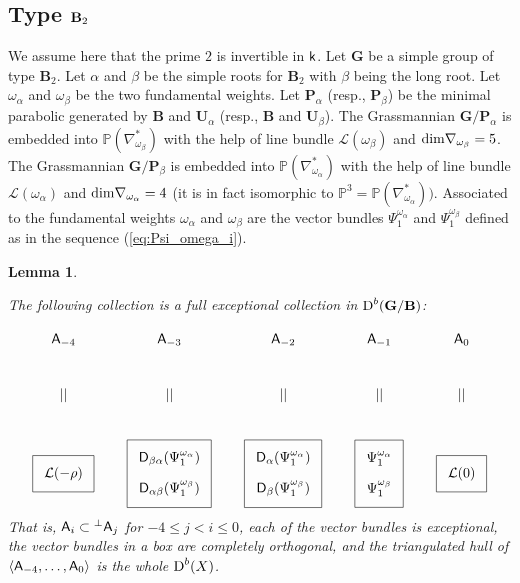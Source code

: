 \documentclass[sn-mathphys-num]{sn-jnl}%
\newcommand{\Ll}{\mathcal L}
\newcommand*{\Dd}{\mathop{\mathrm D\kern0pt}\nolimits}
\newcommand{\A}{{\sf A}}
\newcommand{\sk}{{\sf k}}
\newcommand{\Pp}{\mathbb P}
\newcommand{\bg}{\mathbf G}
\newcommand{\fb}{\mathbf B}
\newcommand{\bp}{\mathbf P}
\newcommand{\bh}{\mathbf H}
\newcommand{\bu}{\mathbf U}
\newtheorem{lemma}[theorem]{Lemma}
\theoremstyle{definition}
\begin{document}
\subsection{ Type ${\bf B}_2$}\label{subsec:typeB_2}
We assume here that the prime $2$ is invertible in $\sk$. 
Let $ \bg$ be a simple group of type ${\fb}_2$. Let $\alpha$ and $\beta$ be the simple roots for ${\fb}_2$ with $\beta$ being the long root. Let $\omega _{\alpha}$ and $\omega _{\beta}$ be the two fundamental weights. Let ${\bp}_{\alpha}$ (resp., ${\bp}_{\beta}$) be the minimal parabolic generated by ${\fb}$ and $\bu_{\alpha}$ (resp., ${\fb}$ and $\bu_{\beta}$). The Grassmannian ${ \bg}/{\bp}_{\alpha}$ is embedded into $  \Pp (\nabla _{\omega _{\beta}}^{\ast})$ with the help of line bundle $\Ll (\omega _{\beta})$ and ${\rm dim}\nabla _{\omega _{\beta}}=5$. The Grassmannian ${ \bg}/{\bp}_{\beta}$ is embedded into $  \Pp (\nabla _{\omega _{\alpha}}^{\ast})$ with the help of line bundle $\Ll (\omega _{\alpha})$ and ${\rm dim}\nabla _{\omega _{\alpha}}=4$ (it is in fact isomorphic to $  \Pp ^3=  \Pp (\nabla _{\omega _{\alpha}}^{\ast}))$.
Associated to the fundamental weights $\omega _{\alpha}$ and $\omega _{\beta}$ are the vector bundles $\Psi _1^{\omega _{\alpha}}$ and $\Psi _1^{\omega _{\beta}}$ defined as in the sequence (\ref{eq:Psi_omega_i}).

\begin{lemma}\label{lem:B_2-Demazure-FEC}

The following collection is a full exceptional collection in $\Dd ^b( \bg/{\fb})$:

\begin{equation}\label{eq:FrobExcCollonSp_4/B}
\xymatrix{
\A _{-4} & \A _{-3}& \A _{-2}& \A _{-1}& \A _0\\
|| & || & || & || & || \\
*++<10pt>[F]\txt{$\Ll (-\rho)$}
&*++<10pt>[F]\txt{${\sf D}_{\beta\alpha}(\Psi _1^{\omega _{\alpha}})$  \\ \\ ${\sf D}_{\alpha\beta}(\Psi _1^{\omega _{\beta}})$}
&*++<10pt>[F]\txt{${\sf D}_{\alpha}(\Psi _1^{\omega _{\alpha}})$  \\ \\ ${\sf D}_{\beta}(\Psi _1^{\omega _{\beta}})$}
&*++<10pt>[F]\txt{$\Psi _1^{\omega _{\alpha}}$  \\ \\ $\Psi _1^{\omega _{\beta}}  $}
 &*++<10pt>[F]\txt{$\Ll (0)$}
}
\end{equation}
That is, $\A _{i}\subset {^{\perp}\A _{j}}$ for $-4\leq j<i\leq 0$,
each of the vector bundles is exceptional, the vector bundles in a box are completely orthogonal, and the triangulated hull of $\langle 
{\sf A}_{-4},\dots,{\sf A}_0\rangle$ is the whole $\Dd ^b(X)$. 
 
\end{lemma}
\end{document}
